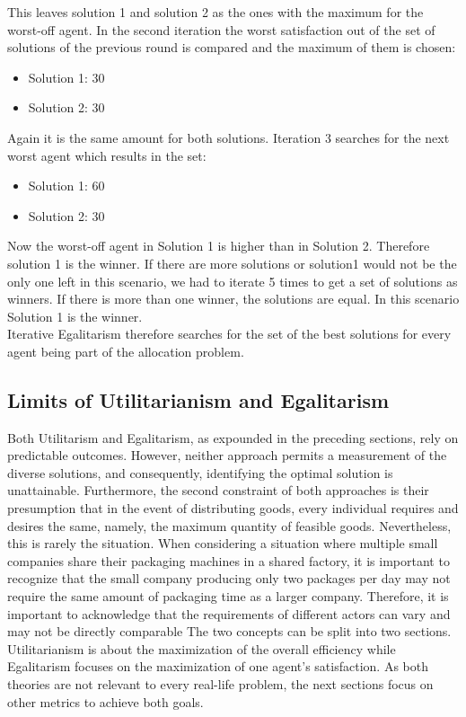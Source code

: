 \documentclass[german, a4paper, 11pt, oneside]{scrbook}
\begin{document}
This leaves solution 1 and solution 2 as the ones with the maximum for the worst-off agent. In the second iteration the worst satisfaction  out of the set of solutions of the previous round is compared and the maximum of them is chosen:
\begin{itemize}
\item Solution 1: 30 
\item Solution 2: 30 
\end{itemize}
Again it is the same amount for both solutions. Iteration 3 searches for the next worst agent which results in the set:
\begin{itemize}
\item Solution 1: 60 
\item Solution 2: 30 
\end{itemize}
Now the worst-off agent in Solution 1 is higher than in Solution 2. Therefore solution 1 is the winner. If there are more solutions or solution1 would not be the only one left in this scenario, we had to iterate 5 times to get a set of solutions as winners. If there is more than one winner, the solutions are equal. In this scenario Solution 1 is the winner. \\Iterative Egalitarism therefore searches for the set of the best solutions for every agent being part of the allocation problem.

\subsection{Limits of Utilitarianism and Egalitarism}
Both Utilitarism and Egalitarism, as expounded in the preceding sections, rely on predictable outcomes. However, neither approach permits a measurement of the diverse solutions, and consequently, identifying the optimal solution is unattainable. Furthermore, the second constraint of both approaches is their presumption that in the event of distributing goods, every individual requires and desires the same, namely, the maximum quantity of feasible goods. \cite{.,XinyingChen.2023,Bhavnani.2022b} Nevertheless, this is rarely the situation. When considering a situation where multiple small companies share their packaging machines in a shared factory, it is important to recognize that the small company producing only two packages per day may not require the same amount of packaging time as a larger company. Therefore, it is important to acknowledge that the requirements of different actors can vary and may not be directly comparable The two concepts can be split into two sections. Utilitarianism is about the maximization of the overall efficiency while Egalitarism focuses on the maximization of one agent's satisfaction. As both theories are not relevant to every real-life problem, the next sections focus on other metrics to achieve both goals.
\end{document}
